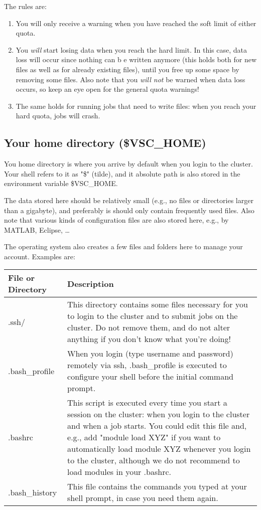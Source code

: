 The rules are:
\begin{enumerate}
\item  You will only receive a warning when you have reached the soft limit of either quota.
\item  You \textit{will} start losing data when you reach the hard limit. In this case, data loss will occur  since nothing can b e written anymore (this holds both for new files as well as for already existing files), until you free up some space by removing some files. Also note that you \textit{will not} be warned when data loss occurs, so keep an eye open for the general quota warnings!
\item  The same holds for running jobs that need to write files: when you reach your hard quota, jobs will crash.
\end{enumerate}

\subsection{Your home directory (\$VSC\_HOME)}

You home directory is where you arrive by default when you login to the cluster. Your shell refers to it as "\$" (tilde), and it absolute path is also stored in the environment variable \$VSC\_HOME.

The data stored here should be relatively small (e.g., no files or directories larger than a gigabyte), and preferably is should only contain frequently used files. Also note that various kinds of configuration files are also stored here, e.g., by MATLAB, Eclipse, \ldots

The operating system also creates a few files and folders here to manage your account. Examples are:

\begin{tabular}{|p{0.7in}|p{3.3in}|} \hline
\textbf{File or Directory} & \textbf{Description} \\ \hline
.ssh/ & This directory contains some files necessary for you to login to the cluster and to submit jobs on the cluster. Do not remove them, and do not alter anything if you don't know what you're doing! \\ \hline
.bash\_profile & When you login (type username and password) remotely via ssh, .bash\_profile is executed to configure your shell before the initial command prompt. \\ \hline
.bashrc & This script is executed every time you start a session on the cluster: when you login to the cluster and when a job starts. You could edit this file and, e.g., add "module load XYZ" if you want to automatically load module XYZ whenever you login to the cluster, although we do not recommend to load modules in your .bashrc. \\ \hline
.bash\_history & This file contains the commands you typed at your shell prompt, in case you need them again. \\ \hline
\end{tabular}

